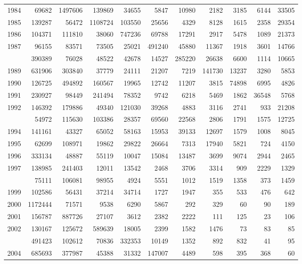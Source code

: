 \documentclass[
]{article}
\begin{document}
\begin{longtable}[t]{lrrrrrrrrrr}
1984 & 69682 & 1497606 & 139869 & 34655 & 5847 & 10980 & 2182 & 3185 & 6144 & 33505\\
1985 & 139287 & 56472 & 1108724 & 103550 & 25656 & 4329 & 8128 & 1615 & 2358 & 29354\\
1986 & 104371 & 111810 & 38060 & 747236 & 69788 & 17291 & 2917 & 5478 & 1089 & 21373\\
1987 & 96155 & 83571 & 73505 & 25021 & 491240 & 45880 & 11367 & 1918 & 3601 & 14766\\
\addlinespace
1988 & 390389 & 76028 & 48522 & 42678 & 14527 & 285220 & 26638 & 6600 & 1114 & 10665\\
1989 & 631906 & 303840 & 37779 & 24111 & 21207 & 7219 & 141730 & 13237 & 3280 & 5853\\
1990 & 126725 & 494892 & 160567 & 19965 & 12742 & 11207 & 3815 & 74898 & 6995 & 4826\\
1991 & 230927 & 98449 & 241494 & 78352 & 9742 & 6218 & 5469 & 1862 & 36548 & 5768\\
1992 & 146392 & 179886 & 49340 & 121030 & 39268 & 4883 & 3116 & 2741 & 933 & 21208\\
\addlinespace
1993 & 54972 & 115630 & 103386 & 28357 & 69560 & 22568 & 2806 & 1791 & 1575 & 12725\\
1994 & 141161 & 43327 & 65052 & 58163 & 15953 & 39133 & 12697 & 1579 & 1008 & 8045\\
1995 & 62699 & 108971 & 19862 & 29822 & 26664 & 7313 & 17940 & 5821 & 724 & 4150\\
1996 & 333134 & 48887 & 55119 & 10047 & 15084 & 13487 & 3699 & 9074 & 2944 & 2465\\
1997 & 138985 & 241403 & 12011 & 13542 & 2468 & 3706 & 3314 & 909 & 2229 & 1329\\
\addlinespace
1998 & 75111 & 106081 & 98955 & 4924 & 5551 & 1012 & 1519 & 1358 & 373 & 1459\\
1999 & 102586 & 56431 & 37214 & 34714 & 1727 & 1947 & 355 & 533 & 476 & 642\\
2000 & 1172444 & 71571 & 9538 & 6290 & 5867 & 292 & 329 & 60 & 90 & 189\\
2001 & 156787 & 887726 & 27107 & 3612 & 2382 & 2222 & 111 & 125 & 23 & 106\\
2002 & 130167 & 125672 & 589639 & 18005 & 2399 & 1582 & 1476 & 73 & 83 & 85\\
\addlinespace
2003 & 491423 & 102612 & 70836 & 332353 & 10149 & 1352 & 892 & 832 & 41 & 95\\
2004 & 685693 & 377987 & 45388 & 31332 & 147007 & 4489 & 598 & 395 & 368 & 60\\

\end{longtable}
\end{document}
